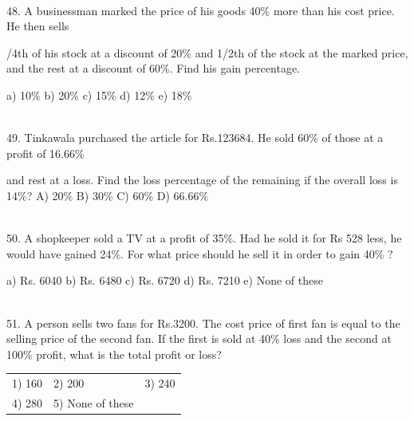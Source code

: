 \documentclass{article} %
\begin{document}
\noindent 

\noindent 

\noindent \\  48. A businessman marked the price of his goods 40\% more than his cost price. He then sells

\noindent 

/4th of his stock at a discount of 20\% and 1/2th of the stock at the marked price, and the rest at a discount of 60\%. Find his gain percentage.

\noindent a) 10\%                    b) 20\%              c) 15\%              d) 12\%              e) 18\%

\noindent 

\noindent 

\noindent  \\ 49. Tinkawala purchased the article for Rs.123684. He sold 60\% of those at a profit of 16.66\%

\noindent 

\noindent and rest at a loss. Find the loss percentage of the remaining if the overall loss is 14\%? A) 20\%                   B) 30\%              C) 60\%             D) 66.66\%

\noindent 

\noindent 

\noindent \\  50. A shopkeeper sold a TV at a profit of 35\%. Had he sold it for Rs 528 less, he would have gained 24\%. For what price should he sell it in order to gain 40\% ?

\noindent a) Rs. 6040             b) Rs. 6480       c) Rs. 6720       d) Rs. 7210      e) None of these

\noindent 

\noindent 

\noindent \\  51. A person sells two fans for Rs.3200. The cost price of first fan is equal to the selling price of the second fan. If the first is sold at 40\% loss and the second at 100\% profit, what is the total profit or loss?

\noindent 
\begin{tabular}{p{1.7in} p{1.6in} p{1.6in}} \\ 
	1) 160         &  2) 200               &  3) 240               \\
4) 280               & 5) None of these  \\
\end{tabular}
\end{document}
